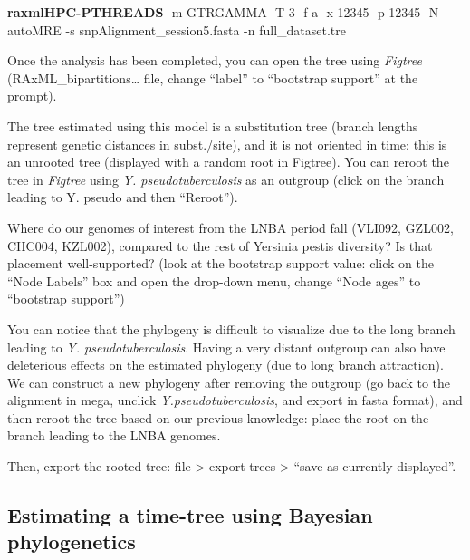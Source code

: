 \documentclass[
  letterpaper,
]{book}
\newenvironment{Shaded}{}{}
\newcommand{\AttributeTok}[1]{\textcolor[rgb]{0.84,0.23,0.29}{#1}}
\newcommand{\ExtensionTok}[1]{\textcolor[rgb]{0.84,0.23,0.29}{\textbf{#1}}}
\newcommand{\NormalTok}[1]{\textcolor[rgb]{0.14,0.16,0.18}{#1}}
\begin{document}
\begin{Shaded}
\begin{Highlighting}[]
\ExtensionTok{raxmlHPC{-}PTHREADS} \AttributeTok{{-}m}\NormalTok{ GTRGAMMA }\AttributeTok{{-}T}\NormalTok{ 3 }\AttributeTok{{-}f}\NormalTok{ a }\AttributeTok{{-}x}\NormalTok{ 12345 }\AttributeTok{{-}p}\NormalTok{ 12345 }\AttributeTok{{-}N}\NormalTok{ autoMRE }\AttributeTok{{-}s}\NormalTok{ snpAlignment\_session5.fasta }\AttributeTok{{-}n}\NormalTok{ full\_dataset.tre}
\end{Highlighting}
\end{Shaded}

Once the analysis has been completed, you can open the tree using
\emph{Figtree} (RAxML\_bipartitions\ldots{} file, change ``label'' to
``bootstrap support'' at the prompt).

The tree estimated using this model is a substitution tree (branch
lengths represent genetic distances in subst./site), and it is not
oriented in time: this is an unrooted tree (displayed with a random root
in Figtree). You can reroot the tree in \emph{Figtree} using \emph{Y.
pseudotuberculosis} as an outgroup (click on the branch leading to Y.
pseudo and then ``Reroot'').

Where do our genomes of interest from the LNBA period fall (VLI092,
GZL002, CHC004, KZL002), compared to the rest of Yersinia pestis
diversity? Is that placement well-supported? (look at the bootstrap
support value: click on the ``Node Labels'' box and open the drop-down
menu, change ``Node ages'' to ``bootstrap support'')

You can notice that the phylogeny is difficult to visualize due to the
long branch leading to \emph{Y. pseudotuberculosis}. Having a very
distant outgroup can also have deleterious effects on the estimated
phylogeny (due to long branch attraction). We can construct a new
phylogeny after removing the outgroup (go back to the alignment in mega,
unclick \emph{Y.pseudotuberculosis}, and export in fasta format), and
then reroot the tree based on our previous knowledge: place the root on
the branch leading to the LNBA genomes.

Then, export the rooted tree: file \textgreater{} export trees
\textgreater{} ``save as currently displayed''.

\hypertarget{estimating-a-time-tree-using-bayesian-phylogenetics}{%
\subsection{Estimating a time-tree using Bayesian
phylogenetics}\label{estimating-a-time-tree-using-bayesian-phylogenetics}}
\end{document}
